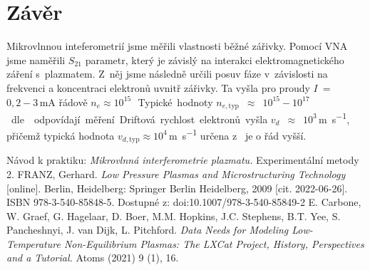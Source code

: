 \documentclass[a4paper,12pt]{article}
\begin{document}
\section{Závěr}
\par Mikrovlnnou inteferometrií jsme měřili vlastnosti běžné zářivky. Pomocí 
VNA jsme na\-mě\-ři\-li $S_{21}$ parametr, který je závislý na interakci 
elektromagnetického záření s~plazmatem. Z~něj jsme následně určili posuv 
fáze v~závislosti na frekvenci a koncentraci elektronů uvnitř zářivky. Ta 
vyšla pro proudy $I$~=~$0,2-3$\,\si{\milli\ampere} řádově $n_e \approx 
10^{15}$\,\si{\cubic\per\meter}. Typické 
hodnoty $n_{e,\text{typ}}$~$\approx$~$10^{15}-10^{17}$\,\si{\cubic\per\meter} 
dle 
\cite{conc} odpovídají měření. Driftová rychlost elektronů vyšla 
$v_{d}$~$\approx$~$10^3$\,\si{\meter\per\second}, přičemž typická hodnota 
$v_{d,\text{typ}} \approx 
10^4$\,\si{\meter\per\second} určena z~\cite{lxcat} je o řád vyšší.

\begin{thebibliography}{10}
	Návod k praktiku: \textit{Mikrovlnná interferometrie plazmatu.} 
	Experimentální metody 2.
	FRANZ, Gerhard. \textit{Low Pressure Plasmas and Microstructuring 
	Technology} 
	[online]. Berlin, Heidelberg: Springer Berlin Heidelberg, 2009 [cit. 
	2022-06-26]. ISBN 978-3-540-85848-5. Dostupné z: 
	doi:10.1007/978-3-540-85849-2
	E. Carbone, W. Graef, G. Hagelaar, D. Boer, M.M. Hopkins, J.C. Stephens, 
	B.T. Yee, S. Pancheshnyi, J. van Dijk, L. Pitchford. \textit{Data Needs for 
	Modeling Low-Temperature Non-Equilibrium Plasmas: The LXCat Project, 
	History, Perspectives and a Tutorial.} Atoms (2021) 9 (1), 16.
\end{thebibliography}
\end{document}
